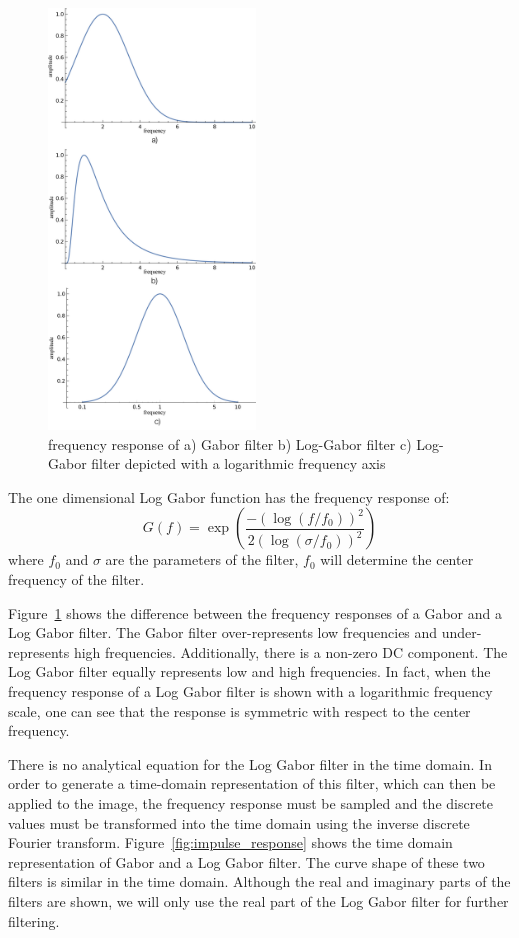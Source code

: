 \documentclass[journal]{IEEEtran}
\begin{document}
\begin{figure}[t]
	\centering
  \includegraphics[width=0.49\textwidth]{iris/freq_response_gabor.png}
	\caption{frequency response of  a) Gabor filter b) Log-Gabor filter c) Log-Gabor filter depicted with a logarithmic frequency axis}
	\label{fig:frequency_response}
\end{figure}

The one dimensional Log Gabor function has the frequency response of:
\[
	G(f) = \exp\left( \frac{-(\log(f/f_0))^2}{2(\log(\sigma/f_0))^2}\right)
\]
where $f_0$ and $\sigma$ are the parameters of the filter, $f_0$ will determine the center frequency of the filter.

Figure~\ref{fig:frequency_response} shows the difference between the frequency responses of a Gabor and a Log Gabor filter. The Gabor filter over-represents low frequencies and under-represents high frequencies. Additionally, there is a non-zero DC component. The Log Gabor filter equally represents low and high frequencies. In fact, when the frequency response of a Log Gabor filter is shown with a logarithmic frequency scale, one can see that the response is symmetric with respect to the center frequency.

There is no analytical equation for the Log Gabor filter in the time domain. In order to generate a time-domain representation of this filter, which can then be applied to the image, the frequency response must be sampled and the discrete values must be transformed into the time domain using the inverse discrete Fourier transform. Figure~\ref{fig:impulse_response} shows the time domain representation of Gabor and a Log Gabor filter. The curve shape of these two filters is similar in the time domain. Although the real and imaginary parts of the filters are shown, we will only use the real part of the Log Gabor filter for further filtering.
\end{document}
